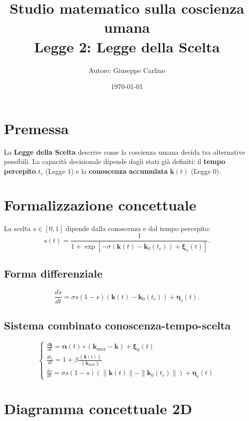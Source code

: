 \documentclass[12pt,a4paper]{article}
\title{\centering Studio matematico sulla coscienza umana \\ Legge 2: Legge della Scelta}
\author{Autore: Giuseppe Carlino}
\date{\today}
\begin{document}
\maketitle

\section{Premessa}
La \textbf{Legge della Scelta} descrive come la coscienza umana decida tra alternative possibili.  
La capacità decisionale dipende dagli stati già definiti: il \textbf{tempo percepito} $t_c$ (Legge 1) e la \textbf{conoscenza accumulata} $\bm{k}(t)$ (Legge 0).  

\section{Formalizzazione concettuale}
La scelta $s \in [0,1]$ dipende dalla conoscenza e dal tempo percepito:
\[
s(t) = \frac{1}{1 + \exp[-\sigma (\bm{k}(t) - \bm{k}_0(t_c)) + \bm{\xi}_s(t)]}.
\]

\subsection{Forma differenziale}
\[
\frac{ds}{dt} = \sigma s (1-s)(\bm{k}(t)-\bm{k}_0(t_c)) + \bm{\eta}_s(t).
\]

\subsection{Sistema combinato conoscenza-tempo-scelta}
\[
\begin{cases}
\displaystyle \frac{d \bm{k}}{dt} = \bm{\alpha}(t) \circ (\bm{k}_{\max}-\bm{k}) + \bm{\xi}_k(t)\\
\displaystyle \frac{dt_c}{dt} = 1 + \beta \frac{\|\bm{k}(t)\|}{\|\bm{k}_{\max}\|}\\
\displaystyle \frac{ds}{dt} = \sigma s (1-s)(\|\bm{k}(t)\| - \|\bm{k}_0(t_c)\|) + \bm{\eta}_s(t)
\end{cases}
\]

\section{Diagramma concettuale 2D}

\begin{center}
\end{center}
\end{document}

